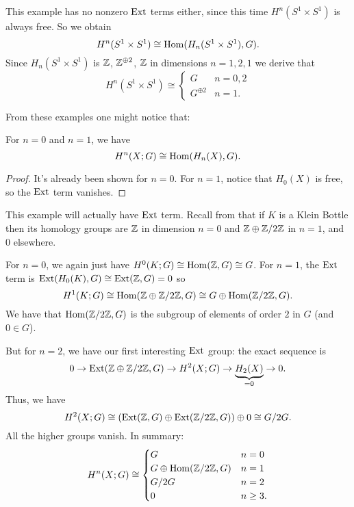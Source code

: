 \begin{example}
	This example has no nonzero $\operatorname{Ext}$ terms either,
	since this time $H^n(S^1 \times S^1)$ is always free.
	So we obtain
	\[ H^n(S^1 \times S^1) \cong \operatorname{Hom}(H_n(S^1 \times S^1), G). \]
	Since $H_n(S^1 \times S^1)$ is $\mathbb Z$, $\mathbb Z^{\oplus 2}$, $\mathbb Z$
	in dimensions $n=1,2,1$ we derive that
	\[
		H^n(S^1 \times S^1)
		\cong
		\begin{cases}
			G & n = 0,2 \\
			G^{\oplus 2} & n = 1.
		\end{cases}
	\]
\end{example}

From these examples one might notice that:
\begin{lemma}
	For $n = 0$ and $n = 1$, we have
	\[ H^n(X;G) \cong \operatorname{Hom}(H_n(X), G). \]
\end{lemma}
\begin{proof}
	It's already been shown for $n=0$.
	For $n=1$, notice that $H_0(X)$ is free,
	so the $\operatorname{Ext}$ term vanishes.
\end{proof}

\begin{example}
	This example will actually have $\operatorname{Ext}$ term.
	Recall from  that if $K$ is a Klein Bottle then its homology groups are
	$\mathbb Z$ in dimension $n=0$ and $\mathbb Z \oplus \mathbb Z/2\mathbb Z$ in $n=1$, and $0$ elsewhere.

	For $n=0$, we again just have $H^0(K;G) \cong \operatorname{Hom}(\mathbb Z, G) \cong G$.
	For $n=1$, the $\operatorname{Ext}$ term is $\operatorname{Ext}(H_0(K), G) \cong \operatorname{Ext}(\mathbb Z, G) = 0$
	so \[ H^1(K;G) \cong \operatorname{Hom}(\mathbb Z \oplus \mathbb Z/2\mathbb Z, G) \cong G \oplus \operatorname{Hom}(\mathbb Z/2\mathbb Z, G). \]
	We have that $\operatorname{Hom}(\mathbb Z/2\mathbb Z,G)$ is the subgroup
	of elements of order $2$ in $G$ (and $0 \in G$).

	But for $n=2$, we have our first interesting $\operatorname{Ext}$ group:
	the exact sequence is
	\[ 0 \to \operatorname{Ext}(\mathbb Z \oplus \mathbb Z/2\mathbb Z, G) \to H^2(X;G) \to \underbrace{H_2(X)}_{=0} \to 0. \]
	Thus, we have
	\[ H^2(X;G) \cong \left( \operatorname{Ext}(\mathbb Z,G) \oplus \operatorname{Ext}(\mathbb Z/2\mathbb Z,G) \right) \oplus 0
		\cong G/2G. \]
	All the higher groups vanish.
	In summary:
	\[
		H^n(X;G) \cong
		\begin{cases}
			G & n = 0 \\
			G \oplus \operatorname{Hom}(\mathbb Z/2\mathbb Z, G) & n = 1 \\
			G/2G & n = 2 \\
			0 & n \ge 3.
		\end{cases}
	\]
\end{example}

